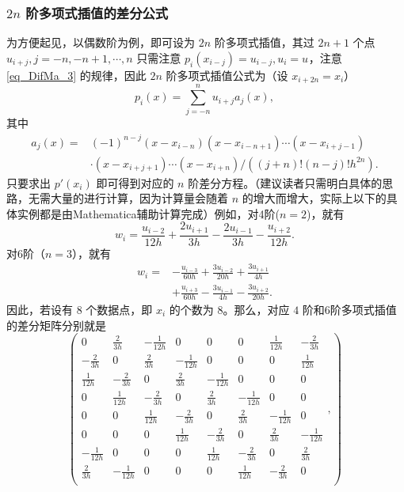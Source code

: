 \subsubsection{$2n$ 阶多项式插值的差分公式}
为方便起见，以偶数阶为例，即可设为 $2n$ 阶多项式插值，其过 $2n+1$ 个点 $u_{i+j},j=-n,-n+1,\cdots ,n$ 只需注意 $p_i(x_{i-j})=u_{i-j},u_{i}=u_{}$，注意\autoref{eq_DifMa_3} 的规律，因此 $2n$ 阶多项式插值公式为（设 $x_{i+2n}=x_i$）
\begin{equation}
p_i(x)=\sum_{j=-n}^n u_{i+j}a_{j}(x),~
\end{equation}
其中 
\begin{equation}
\begin{aligned}
a_{j}(x)=&(-1)^{n-j}(x-x_{i-n})(x-x_{i-n+1})\cdots(x-x_{i+j-1})\\
&\cdot(x-x_{i+j+1})\cdots(x-x_{i+n})/((j+n)!(n-j)!h^{2n}).
\end{aligned}~
\end{equation}
只要求出 $p'(x_i)$ 即可得到对应的 $n$ 阶差分方程。（建议读者只需明白具体的思路，无需大量的进行计算，因为计算量会随着 $n$ 的增大而增大，实际上以下的具体实例都是由Mathematica辅助计算完成）例如，对4阶($n=2$)，就有
\begin{equation}
w_i=\frac{u_{i-2}}{12 h}+\frac{2 u_{i+1}}{3 h}-\frac{2 u_{i-1}}{3 h}-\frac{u_{i+2}}{12 h}.~
\end{equation}
对6阶（$n=3$），就有
\begin{equation}
\begin{aligned}
w_i=&-\frac{u_{i-3}}{60 h}+\frac{3 u_{i-2}}{20 h}+\frac{3 u_{i+1}}{4 h}\\
&+\frac{u_{i+3}}{60 h}-\frac{3 u_{i-1}}{4 h}-\frac{3 u_{i+2}}{20 h}.
\end{aligned}~
\end{equation}
因此，若设有 $8$ 个数据点，即 $x_i$ 的个数为 $8$。那么，对应 $4$ 阶和6阶多项式插值的差分矩阵分别就是
\begin{equation}
\left(
\begin{array}{cccccccc}
 0 & \frac{2}{3 h} & -\frac{1}{12 h} & 0 & 0 & 0 & \frac{1}{12 h} & -\frac{2}{3 h} \\
 -\frac{2}{3 h} & 0 & \frac{2}{3 h} & -\frac{1}{12 h} & 0 & 0 & 0 & \frac{1}{12 h} \\
 \frac{1}{12 h} & -\frac{2}{3 h} & 0 & \frac{2}{3 h} & -\frac{1}{12 h} & 0 & 0 & 0 \\
 0 & \frac{1}{12 h} & -\frac{2}{3 h} & 0 & \frac{2}{3 h} & -\frac{1}{12 h} & 0 & 0 \\
 0 & 0 & \frac{1}{12 h} & -\frac{2}{3 h} & 0 & \frac{2}{3 h} & -\frac{1}{12 h} & 0 \\
 0 & 0 & 0 & \frac{1}{12 h} & -\frac{2}{3 h} & 0 & \frac{2}{3 h} & -\frac{1}{12 h} \\
 -\frac{1}{12 h} & 0 & 0 & 0 & \frac{1}{12 h} & -\frac{2}{3 h} & 0 & \frac{2}{3 h} \\
 \frac{2}{3 h} & -\frac{1}{12 h} & 0 & 0 & 0 & \frac{1}{12 h} & -\frac{2}{3 h} & 0 \\
\end{array},
\right)~
\end{equation}
